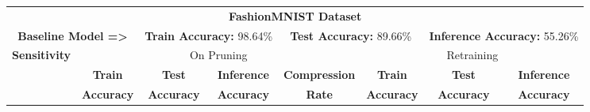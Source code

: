 \begin{table*}[!htb]
\begin{center}
\renewcommand\arraystretch{1.5}
\fontsize{6.7pt}{6.7pt}\selectfont
\begin{tabular}{|c|c|c|c|c|c|c|c|}
\hline
\multicolumn{8}{|c|}{\textbf{FashionMNIST Dataset}}\\
\multicolumn{2}{|c}{\textbf{Baseline Model =>}} & \multicolumn{2}{c}{\textbf{Train Accuracy:} 98.64\%} & \multicolumn{2}{c}{\textbf{Test Accuracy:} 89.66\%} & \multicolumn{2}{c|}{\textbf{Inference Accuracy:} 55.26\%}\\
\hline
\multirow{3}{*}{\textbf{Sensitivity}} & \multicolumn{4}{|c|}{On Pruning} & \multicolumn{3}{|c|}{Retraining}\\
\hline
 & \textbf{Train}  & \textbf{Test}  & \textbf{Inference}  & \textbf{Compression} & \textbf{Train}  & \textbf{Test}  & \textbf{Inference}  \\
                      & \textbf{Accuracy} & \textbf{Accuracy} & \textbf{Accuracy} & \textbf{Rate} & \textbf{Accuracy} & \textbf{Accuracy} & \textbf{Accuracy}  \\


\end{tabular}
\end{center}
\end{table*}
